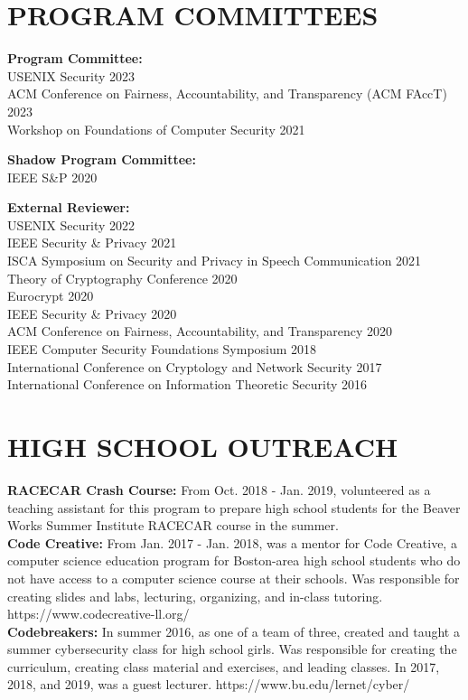 \documentclass{res}
\begin{document}
\begin{resume}
\section{PROGRAM COMMITTEES}
\vspace{0.1in}

\textbf{Program Committee:} \\
USENIX Security 2023 \\
ACM Conference on Fairness, Accountability, and Transparency (ACM FAccT) 2023 \\
Workshop on Foundations of Computer Security 2021

\textbf{Shadow Program Committee:} \\
IEEE S\&P 2020

\textbf{External Reviewer:} \\
USENIX Security 2022 \\
IEEE Security \& Privacy 2021 \\
ISCA Symposium on Security and Privacy in Speech Communication 2021 \\
Theory of Cryptography Conference 2020 \\
Eurocrypt 2020 \\
IEEE Security \& Privacy 2020 \\
ACM Conference on Fairness, Accountability, and Transparency 2020 \\
IEEE Computer Security Foundations Symposium 2018 \\
International Conference on Cryptology and Network Security 2017 \\
International Conference on Information Theoretic Security 2016

\vspace{0.25in}


\section{HIGH SCHOOL OUTREACH}
\vspace{0.1in}

\textbf{RACECAR Crash Course:} From Oct. 2018 - Jan. 2019, volunteered as a teaching assistant for
this program to prepare high school students for the Beaver Works Summer Institute RACECAR course in the summer. \\
\textbf{Code Creative:} From Jan. 2017 - Jan. 2018, was a mentor for Code Creative, a computer science education
program for Boston-area high school students who do not have access to a computer science course at their schools.
Was responsible for creating slides and labs, lecturing, organizing, and in-class tutoring.
https://www.codecreative-ll.org/ \\
\textbf{Codebreakers:} In summer 2016, as one of a team of three, created and taught a summer cybersecurity class for
high school girls.  Was responsible for creating the curriculum, creating class material and exercises, and leading
classes.  In 2017, 2018, and 2019, was a guest lecturer.  https://www.bu.edu/lernet/cyber/ \\



\end{resume}
\end{document}
